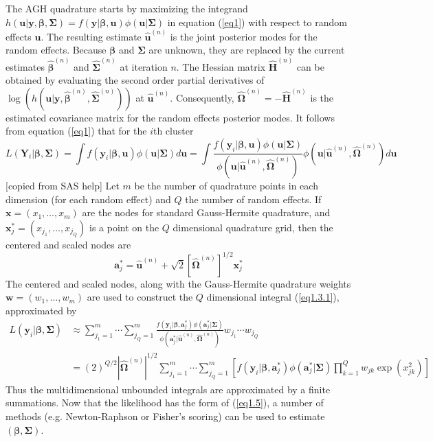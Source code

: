 	The AGH quadrature starts by maximizing the integrand $h(\bm u|\bm y, \bm \beta, \bm \Sigma)= f(\bm y|\bm \beta, \bm u)\phi(\bm u|\bm \Sigma)$ in equation (\ref{eq1}) with respect to random effects $\bm u$. The resulting estimate $\hat{\bm u}^{(n)}$ is the joint posterior modes for the random effects. Because $\bm \beta$ and $\bm \Sigma$ are unknown, they are replaced by the current estimates $\hat{\bm \beta}^{(n)}$ and $\hat{\bm \Sigma}^{(n)}$ at iteration $n$. The Hessian matrix $\hat{\bm H}^{(n)}$ can be obtained by evaluating the second order partial derivatives of $\log(h(\bm u|\bm y, \hat{\bm \beta}^{(n)}, \hat{\bm \Sigma}^{(n)}))$ at $\hat{\bm u}^{(n)}$.  Consequently, $\hat{\bm \Omega}^{(n)} =-\hat{\bm H}^{(n)} $ is the estimated covariance matrix for the random effects posterior modes. It follows from equation (\ref{eq1}) that for the $i$th cluster 
	\begin{equation}\label{eq1.3.1}
		L( \bm Y_i|\bm \beta, \bm \Sigma) = \int f(\bm y_i|\bm \beta, \bm u )\phi(\bm u|\bm\Sigma)d\bm u = 
		\int \frac{f(\bm y_i|\bm \beta, \bm u )\phi(\bm u|\bm\Sigma)}{\phi(\bm u|\hat{\bm u}^{(n)},\hat{\bm \Omega}^{(n)} )}\phi(\bm u|\hat{\bm u}^{(n)},\hat{\bm \Omega}^{(n)} )d\bm u
	\end{equation}
	[copied from SAS help] Let $m$ be the number of quadrature points in each dimension (for each random effect) and $Q$ the number of random effects. If $\bm x = (x_1, \ldots, x_m)$ are the nodes for standard Gauss-Hermite quadrature, and $\bm x^{\ast}_j=(x_{j_1}, \ldots, x_{j_Q}) $ is a point on the $Q$ dimensional quadrature grid, then the centered and scaled nodes are 
	\begin{equation}\label{1.3.2}
		\bm  a_j^{\ast} = \hat{\bm u}^{(n)} + \sqrt{2} [\hat{\bm \Omega}^{(n)} ]^{1/2}\bm x^{\ast}_j
	\end{equation}
	The centered and scaled nodes, along with the Gauss-Hermite quadrature weights $\bm w = (w_1, \ldots, w_m)$ are used to construct the $Q$ dimensional integral (\ref{eq1.3.1}), approximated by 
	\begin{equation}\label{eq1.5}
	\begin{aligned}
		L(\bm y_i|\bm\beta, \bm \Sigma) &\approx\sum_{j_1=1}^m\cdots \sum_{j_Q=1}^m\frac{f(\bm y_i|\bm \beta, \bm  a_j^{\ast})\phi(\bm  a_j^{\ast}|\bm\Sigma)}{\phi(\bm  a_j^{\ast}|\hat{\bm u}^{(n)},\hat{\bm \Omega}^{(n)} )}w_{j_1}\cdots w_{j_Q}\\
		& = (2)^{Q/2}|\hat{\bm \Omega}^{(n)}|^{1/2}\sum_{j_1=1}^m\cdots \sum_{j_Q=1}^m\left[ f(\bm y_i|\bm \beta, \bm  a_j^{\ast} )\phi(\bm  a_j^{\ast}|\bm\Sigma) \prod_{k=1}^Qw_{jk}\exp(x_{jk}^2)\right]
	\end{aligned}
	\end{equation}
	Thus the multidimensional unbounded integrals are approximated by a finite summations. Now that the likelihood has the form of (\ref{eq1.5}), a number of methods (e.g. Newton-Raphson or Fisher's scoring) can be used to estimate $(\bm \beta,  \bm \Sigma)$. 

